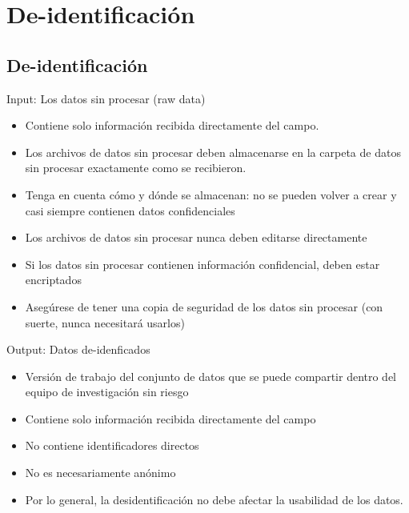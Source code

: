 \documentclass[10pt, aspectratio=169, compress]{beamer}
\begin{document}
\section{De-identificación}
\subsection{De-identificación}
\begin{frame}[t]{Input: Los datos sin procesar (raw data)}
	\begin{itemize}
		\item Contiene solo información recibida directamente del campo.
		\item Los archivos de datos sin procesar deben almacenarse en la carpeta de datos sin procesar exactamente como se recibieron.
		\item Tenga en cuenta cómo y dónde se almacenan: no se pueden volver a crear y casi siempre contienen datos confidenciales
		\item Los archivos de datos sin procesar nunca deben editarse directamente
		\item Si los datos sin procesar contienen información confidencial, deben estar encriptados
		\item Asegúrese de tener una copia de seguridad de los datos sin procesar (con suerte, nunca necesitará usarlos)
	\end{itemize}
\end{frame}
\begin{frame}[t]{Output: Datos de-idenficados}
	\begin{itemize}
		\item Versión de trabajo del conjunto de datos que se puede compartir dentro del equipo de investigación sin riesgo
		\item Contiene solo información recibida directamente del campo
		\item No contiene identificadores directos
		\item No es necesariamente anónimo
		\item Por lo general, la desidentificación no debe afectar la usabilidad de los datos.
	\end{itemize}
\end{frame}
\end{document}
